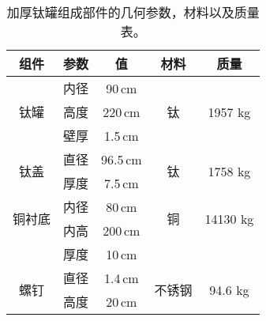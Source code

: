   \begin{table*}[hbt]
    \begin{center}
        \begin{tabular*}{0.75\textwidth}{@{\extracolsep{\fill}}ccccc}
        \hline
        \hline
        \textbf{组件}   &   \textbf{参数}   &   \textbf{值} &   \textbf{材料} & \textbf{质量} \\ \hline
        \multirow{3}{*}{钛罐} 
            &   内径&   90\,cm&     \multirow{3}{*}{钛} &   \multirow{3}{*}{1957 kg} \\
            &   高度&   220\,cm&    &   \\   
            &   壁厚&   1.5\,cm&    &   \\\hline
        \multirow{2}{*}{钛盖} 
            & 直径 & 96.5\,cm & \multirow{2}{*}{钛} & \multirow{2}{*}{1758 kg} \\
            & 厚度 & 7.5\,cm &  &    \\\hline
        \multirow{2}{*}{铜衬底} 
            & 内径 & 80\,cm & \multirow{2}{*}{铜} & \multirow{2}{*}{14130 kg} \\
            & 内高 & 200\,cm &  &    \\
            & 厚度 & 10\,cm &  & \\\hline
        \multirow{2}{*}{螺钉} 
            & 直径 & 1.4\,cm & \multirow{2}{*}{不锈钢} & \multirow{2}{*}{94.6 kg} \\
            & 高度 & 20\,cm &  &    \\
        \hline
        \hline
        \end{tabular*}
        \caption{加厚钛罐组成部件的几何参数，材料以及质量表。\supercite{cdr}}
        \label{tab:ti_structure_big}
    \end{center}
\end{table*}

